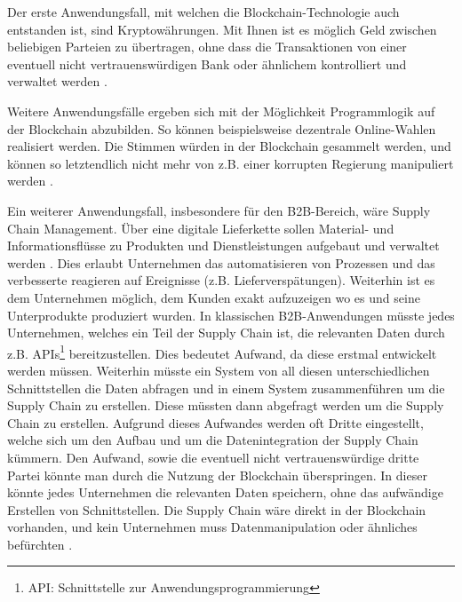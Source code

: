 Der erste Anwendungsfall, mit welchen die Blockchain-Technologie auch entstanden ist, sind Kryptowährungen. Mit Ihnen ist es möglich Geld zwischen beliebigen Parteien zu übertragen, ohne dass die Transaktionen von einer eventuell nicht vertrauenswürdigen Bank oder ähnlichem kontrolliert und verwaltet werden \cite{SwanBlockchainblueprintnew2015}.

Weitere Anwendungsfälle ergeben sich mit der Möglichkeit Programmlogik auf der Blockchain abzubilden. So können beispielsweise dezentrale Online-Wahlen realisiert werden. Die Stimmen würden in der Blockchain gesammelt werden, und können so letztendlich nicht mehr von z.B. einer korrupten Regierung manipuliert werden \cite{CastorEthereumVotingScheme2017}. 

Ein weiterer Anwendungsfall, insbesondere für den B2B-Bereich, wäre Supply Chain Management. Über eine digitale Lieferkette sollen Material- und Informationsflüsse zu Produkten und Dienstleistungen aufgebaut und verwaltet werden \cite{KriegerDefinitionSupplyChain}. Dies erlaubt Unternehmen das automatisieren von Prozessen und das verbesserte reagieren auf Ereignisse (z.B. Lieferverspätungen). Weiterhin ist es dem Unternehmen möglich, dem Kunden exakt aufzuzeigen wo es und seine Unterprodukte produziert wurden. In klassischen B2B-Anwendungen müsste jedes Unternehmen, welches ein Teil der Supply Chain ist, die relevanten Daten durch z.B. APIs\footnote{API: Schnittstelle zur Anwendungsprogrammierung\cite{Programmierschnittstelle2017}} bereitzustellen. Dies bedeutet Aufwand, da diese erstmal entwickelt werden müssen. Weiterhin müsste ein System von all diesen unterschiedlichen Schnittstellen die Daten abfragen und in einem System zusammenführen um die Supply Chain zu erstellen. Diese müssten dann abgefragt werden um die Supply Chain zu erstellen. Aufgrund dieses Aufwandes werden oft Dritte eingestellt, welche sich um den Aufbau und um die Datenintegration der Supply Chain kümmern. Den Aufwand, sowie die eventuell nicht vertrauenswürdige dritte Partei könnte man durch die Nutzung der Blockchain überspringen. In dieser könnte jedes Unternehmen die relevanten Daten speichern, ohne das aufwändige Erstellen von Schnittstellen. Die Supply Chain wäre direkt in der Blockchain vorhanden, und kein Unternehmen muss Datenmanipulation oder ähnliches befürchten \cite{KorpelaDigitalSupplyChain2017}.

